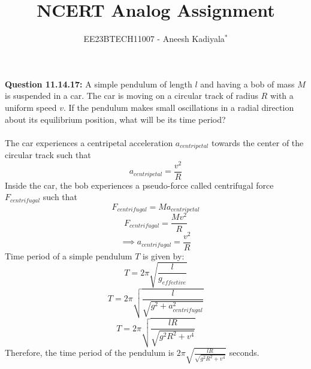 \documentclass[journal,12pt,twocolumn]{IEEEtran}
\theoremstyle{remark}
\begin{document}

\vspace{3cm}

\title{NCERT Analog Assignment}
\author{EE23BTECH11007 - Aneesh Kadiyala$^{*}$%
}
\maketitle
\newpage
\bigskip

\renewcommand{\thefigure}{\theenumi}
\renewcommand{\thetable}{\theenumi}

\vspace{3cm}
\textbf{Question 11.14.17:} A simple pendulum of length $l$ and having a bob of mass $M$ is suspended in a car. The car is moving on a circular track of radius $R$ with a uniform speed $v$. If the pendulum makes small oscillations in a radial direction about its equilibrium position, what will be its time period?
\\
\solution
\\
The car experiences a centripetal acceleration $a_{centripetal}$ towards the center of the circular track such that
\[a_{centripetal} = \frac{v^2}{R}\]
Inside the car, the bob experiences a pseudo-force called centrifugal force $F_{centrifugal}$ such that
\[F_{centrifugal} = Ma_{centripetal}\]
\[F_{centrifugal} = \frac{Mv^2}{R}\]
\[\implies a_{centrifugal} = \frac{v^2}{R}\]
Time period of a simple pendulum $T$ is given by:
\[T = 2\pi\sqrt{\frac{l}{g_{effective}}}\]
\[T = 2\pi\sqrt{\frac{l}{\sqrt{g^2 + a_{centrifugal}^2}}}\]
\[T = 2\pi\sqrt{\frac{lR}{\sqrt{g^2R^2 + v^4}}}\]
Therefore, the time period of the pendulum is $2\pi\sqrt{\frac{lR}{\sqrt{g^2R^2 + v^4}}}$ seconds.
\end{document}
